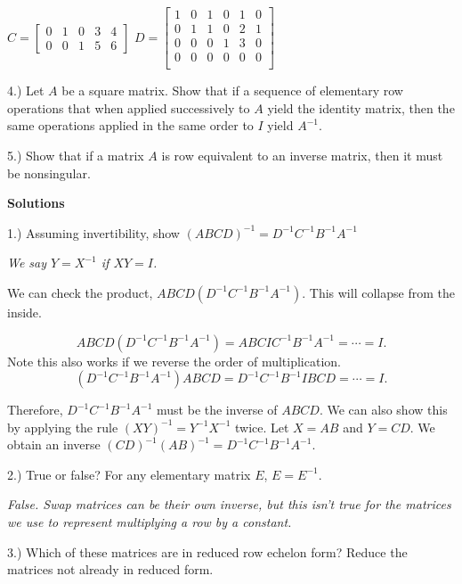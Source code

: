 \documentclass{article}
\begin{document}
$C= \left[\begin{array}{ccccc}
0 & 1 & 0 & 3 & 4\\
0 & 0 & 1 & 5 & 6
\end{array}\right]$ $D= \left[\begin{array}{cccccc}
1 & 0 & 1 & 0 & 1 & 0\\
0 & 1 & 1 & 0 & 2 & 1\\
0 & 0 & 0 & 1 & 3 & 0\\
0 & 0 & 0 & 0 & 0 & 0\\
\end{array}\right]$



\bigskip{}

4.) Let $A$ be a square matrix. Show that if a sequence of elementary row operations that when applied successively to $A$ yield the identity matrix, then the same operations applied in the same order to $I$ yield $A^{-1}$.

5.) Show that if a matrix $A$ is row equivalent to an inverse matrix, then it must be nonsingular.
\pagebreak

\textbf{Solutions}

\medskip{}

1.) Assuming invertibility, show $(ABCD)^{-1}=D^{-1}C^{-1}B^{-1}A^{-1}$
\smallskip

\it
We say $Y=X^{-1}$ if $XY=I$. 

We can check the product, $ABCD(D^{-1}C^{-1}B^{-1}A^{-1})$. This will collapse from the inside.

$$ABCD(D^{-1}C^{-1}B^{-1}A^{-1}) = ABCIC^{-1}B^{-1}A^{-1} = \cdots = I.$$
Note this also works if we reverse the order of multiplication. 
$$(D^{-1}C^{-1}B^{-1}A^{-1}) ABCD = D^{-1}C^{-1}B^{-1}IBCD = \cdots = I.$$


Therefore, $D^{-1}C^{-1}B^{-1}A^{-1}$ must be the inverse of $ABCD$. We can also show this by applying the rule $(XY)^{-1}=Y^{-1}X^{-1}$ twice. Let $X=AB$ and $Y=CD$. We obtain an inverse $(CD)^{-1}(AB)^{-1}=D^{-1}C^{-1}B^{-1}A^{-1}$.
\rm

2.) True or false? For any elementary matrix $E$, $E=E^{-1}$.

\it
False. Swap matrices can be their own inverse, but this isn't true for the matrices we use to represent multiplying a row by a constant. 
\rm

\smallskip

3.) Which of these matrices are in reduced row echelon form? Reduce the matrices not already in reduced form.
\smallskip
\end{document}
